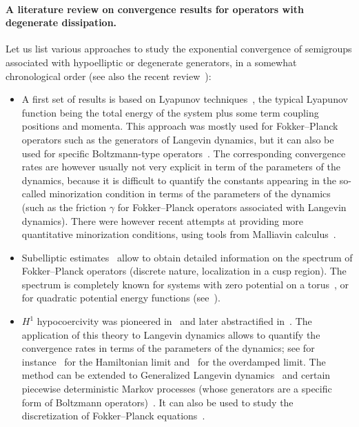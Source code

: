 \documentclass{article}
\begin{document}
\paragraph{A literature review on convergence results for operators with degenerate dissipation.}
Let us list various approaches to study the exponential convergence of
semigroups associated with hypoelliptic or degenerate generators, in a
somewhat chronological order (see also the recent
review~\cite{Herau16}):
\begin{itemize}
\item A first set of results is based on Lyapunov
  techniques~\cite{Wu01,MSH02,rey-bellet}, the typical Lyapunov
  function being the total energy of the system plus some term
  coupling positions and momenta. This approach was mostly used for Fokker--Planck operators
  such as the generators of Langevin dynamics, but it can also be used for specific Boltzmann-type
  operators~\cite{BRSS17,CELMM, CCEY19}. 
  The corresponding convergence rates
  are however usually not very explicit in term of the parameters of
  the dynamics, because it is difficult to quantify the constants appearing in the so-called minorization condition in terms of the parameters of the dynamics (such as the friction $\gamma$ for Fokker--Planck operators associated with Langevin dynamics). There were however recent attempts at providing more quantitative minorization conditions, using tools from Malliavin calculus~\cite{Ev18}. 
  
\item Subelliptic estimates~\cite{EH03,HN04,HN05} allow to obtain detailed information on the spectrum of Fokker--Planck operators (discrete nature, localization in a cusp region). The spectrum is completely known for systems with zero potential on a torus~\cite{Kozlov89}, or for quadratic potential energy functions (see~\cite{MPP02,PavliotisBook}).

\item $H^1$ hypocoercivity was pioneered in~\cite{Talay02,MN06} and later abstractified in~\cite{Villani09}. The application of this theory to Langevin dynamics allows to quantify the convergence rates in terms of the parameters of the dynamics; see for instance~\cite{HP08} for the Hamiltonian limit and~\cite{LMS16,LS16} for the overdamped limit. The method can be extended to Generalized Langevin dynamics~\cite{OP11} and certain piecewise deterministic Markov processes (whose generators are a specific form of Boltzmann operators)~\cite{DPD18}. It can also be used to study the discretization of Fokker--Planck equations~\cite{DHL19,Georg18}. 
 

\end{itemize}
\end{document}
